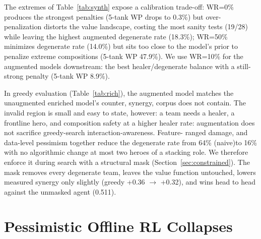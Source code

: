 \documentclass[journal]{IEEEtran}
\providecommand{\DIFaddtex}[1]{{\protect\color{blue} \sf #1}} %
\providecommand{\DIFdeltex}[1]{{\protect\color{red} \scriptsize #1}} %
\providecommand{\DIFaddbegin}{} %
\providecommand{\DIFaddend}{} %
\providecommand{\DIFdelbegin}{} %
\providecommand{\DIFdelend}{} %
\providecommand{\DIFadd}[1]{\texorpdfstring{\DIFaddtex{#1}}{#1}} %
\providecommand{\DIFdel}[1]{\texorpdfstring{\DIFdeltex{#1}}{}} %
\begin{document}
\DIFdel{The extremes of Table~\ref{tab:synth} expose a calibration trade-off: WR=0\% produces the strongest penalties (5-tank WP drops to 0.3\%) but over-penalization distorts the value landscape, costing the most sanity tests (19/28) while leaving the highest augmented degenerate rate (18.3\%); WR=50\% minimizes degenerate rate (14.0\%) but sits too close to the model's prior to penalize extreme compositions (5-tank WP 47.9\%). We use WR=10\% for the augmented models downstream: the best healer/degenerate balance with a still-strong penalty (5-tank WP 8.9\%).
}%

\DIFdel{In greedy evaluation (Table~\ref{tab:rich}), the augmented model matches the unaugmented enriched model's counter, synergy, }\DIFdelend \DIFaddbegin \DIFadd{corpus does not contain. The invalid region is small and easy to state, however: a team needs a healer, a frontline hero, }\DIFaddend and \DIFdelbegin \DIFdel{composition safety at a higher healer rate: augmentation does not sacrifice greedy-search interaction-awareness. Feature- }\DIFdelend \DIFaddbegin \DIFadd{ranged damage, }\DIFaddend and \DIFdelbegin \DIFdel{data-level pessimism together reduce the degenerate rate from 64\% (naive)to 16\% with no algorithmic change}\DIFdelend \DIFaddbegin \DIFadd{at most two heroes of a stacking role. We therefore enforce it during search with a structural mask (Section~\ref{sec:constrained}). The mask removes every degenerate team, leaves the value function untouched, lowers measured synergy only slightly (greedy +0.36 $\to$ +0.32), and wins head to head against the unmasked agent (0.511)}\DIFaddend .

\section{Pessimistic Offline RL Collapses}
\label{sec:cql}
\end{document}

